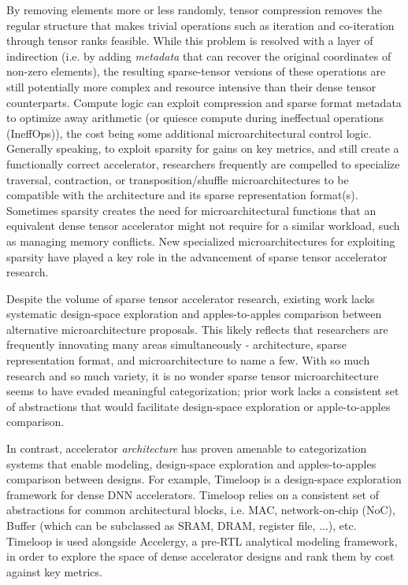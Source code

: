 By removing elements more or less randomly, tensor compression removes the regular structure that makes trivial operations such as iteration and co-iteration through tensor ranks feasible. While this problem is resolved with a layer of indirection (i.e. by adding \textit{metadata} that can recover the original coordinates of non-zero elements\cite{szebook}), the resulting sparse-tensor versions of these operations are still potentially more complex and resource intensive than their dense tensor counterparts. Compute logic can exploit compression and sparse format metadata to optimize away arithmetic\cite{eyerissv2}\cite{sparten}\cite{extensor}\cite{sparch}\cite{szebook}\cite{sparseloop} (or quiesce compute during ineffectual operations (IneffOps)\cite{eyeriss}\cite{sparseloop}\cite{szebook}), the cost being some additional microarchitectural control logic\cite{eyeriss}\cite{eyerissv2}. Generally speaking, to exploit sparsity for gains on key metrics, and still create a functionally correct accelerator, researchers frequently are compelled to specialize traversal\cite{szebook}\cite{extensor}, contraction\cite{gamma}\cite{eyerissv2}\cite{extensor}\cite{sparten}, or transposition/shuffle\cite{gamma} microarchitectures to be compatible with the architecture and its sparse representation format(s). Sometimes sparsity creates the need for microarchitectural functions that an equivalent dense tensor accelerator might not require for a similar workload, such as managing memory conflicts\cite{scnn}\cite{sparten}. New specialized microarchitectures for exploiting sparsity have played a key role in the advancement of sparse tensor accelerator research\cite{gamma}\cite{outerspace}\cite{extensor}\cite{sparch}\cite{outerspace}\cite{ampere}.

Despite the volume of sparse tensor accelerator research, existing work lacks systematic design-space exploration and apples-to-apples comparison between alternative microarchitecture proposals. This likely reflects that researchers are frequently innovating many areas simultaneously - architecture, sparse representation format, and microarchitecture to name a few. With so much research and so much variety, it is no wonder sparse tensor microarchitecture seems to have evaded meaningful categorization; prior work lacks a consistent set of abstractions that would facilitate design-space exploration or apple-to-apples comparison.

In contrast, accelerator \textit{architecture} has proven amenable to categorization systems that enable modeling, design-space exploration and apples-to-apples comparison between designs\cite{timeloop}\cite{sparseloop}\cite{accelergy}\cite{buffet}. For example, Timeloop\cite{timeloop} is a design-space exploration framework for dense DNN accelerators. Timeloop relies on a consistent set of abstractions for common architectural blocks, i.e. MAC, network-on-chip (NoC), Buffer (which can be subclassed as SRAM, DRAM, register file, ...), etc. Timeloop is used alongside Accelergy\cite{accelergy}, a pre-RTL analytical modeling framework, in order to explore the space of dense accelerator designs and rank them by cost against key metrics.

